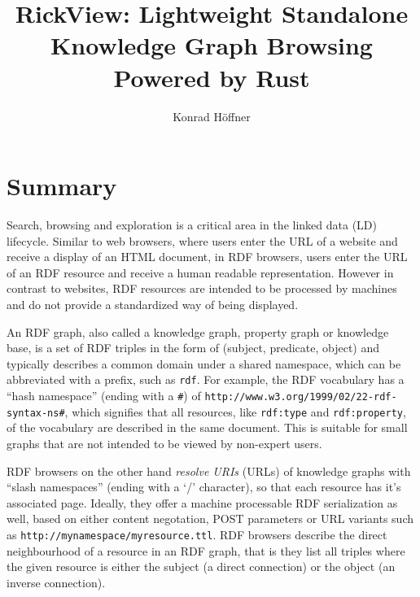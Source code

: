 \documentclass[a4paper]{article}
\begin{document}
\author{Konrad Höffner}
\title{RickView: Lightweight Standalone Knowledge Graph Browsing Powered by Rust}

\maketitle

\section{Summary}\label{summary}

Search, browsing and exploration is a critical area in the linked data (LD) lifecycle.
Similar to web browsers, where users enter the URL of a website and receive a display of an HTML document, in RDF browsers,
users enter the URL of an RDF resource and receive a human readable representation.
However in contrast to websites, RDF resources are intended to be processed by machines and do not provide a standardized way of being displayed.

An RDF graph, also called a knowledge graph, property graph or knowledge base, is a set of RDF triples in the form of (subject, predicate, object) and typically describes a common domain under a shared namespace, which can be abbreviated with a prefix, such as \texttt{rdf}.
For example, the RDF vocabulary has a \enquote{hash namespace} (ending with a \texttt{\#}) of \texttt{http://www.w3.org/1999/02/22-rdf-syntax-ns\#},
which signifies that all resources, like \texttt{rdf:type} and \texttt{rdf:property}, of the vocabulary are described in the same document.
This is suitable for small graphs that are not intended to be viewed by non-expert users.

RDF browsers on the other hand \emph{resolve URIs} (URLs) of knowledge graphs with \enquote{slash namespaces} (ending with a `/' character), so that each resource has it's associated page.
Ideally, they offer a machine processable RDF serialization as well, based on either content negotation, POST parameters or URL variants such as \texttt{http://mynamespace/myresource.ttl}.
RDF browsers describe the direct neighbourhood of a resource in an RDF graph, that is they list all triples where the given resource is either the subject (a direct connection) or the object (an inverse connection).
\end{document}

